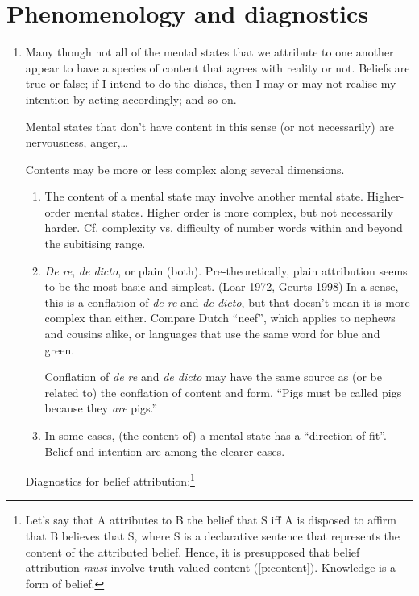 \documentclass[12pt,a4paper]{article}
\newcommand{\E}[1]{\emph{#1}}
\newcommand{\Q}[1]{``#1''}
\begin{document}
\section{Phenomenology and diagnostics}

\begin{enumerate}[label=P$_{\!\arabic*}$]\itemsep=0ex

\item\label{p:content} Many though not all of the mental states that we attribute to one another appear to have a species of content that agrees with reality or not. Beliefs are true or false; if I intend to do the dishes, then I may or may not realise my intention by acting accordingly; and so on.
\par Mental states that don't have content in this sense (or not necessarily) are nervousness, anger,\ldots
\par Contents may be more or less complex along several dimensions.
\begin{enumerate}\itemsep=0ex
\item The content of a mental state may involve another mental state. Higher-order mental states. Higher order is more complex, but not necessarily harder. Cf. complexity vs. difficulty of number words within and beyond the subitising range.
\item \E{De re}, \E{de dicto}, or plain (both). Pre-theoretically, plain attribution seems to be the most basic and simplest. (Loar 1972, Geurts 1998) In a sense, this is a conflation of \E{de re} and \E{de dicto}, but that doesn't mean it is more complex than either. Compare Dutch \Q{neef}, which applies to nephews and cousins alike, or languages that  use the same word for blue and green.
\par Conflation of \E{de re} and \E{de dicto} may have the same source as (or be related to) the conflation of content and form. \Q{Pigs must be called pigs because they \E{are} pigs.}
\item In some cases, (the content of) a mental state has a \Q{direction of fit}. Belief and intention are among the clearer cases. 
\end{enumerate}
Diagnostics for belief attribution:\footnote{Let's say that A attributes to B the belief that S iff A is disposed to affirm that B believes that S, where S is a declarative sentence that represents the content of the attributed belief. Hence, it is presupposed that belief attribution \E{must} involve truth-valued content (\ref{p:content}). Knowledge is a form of belief.}

\end{enumerate}
\end{document}

